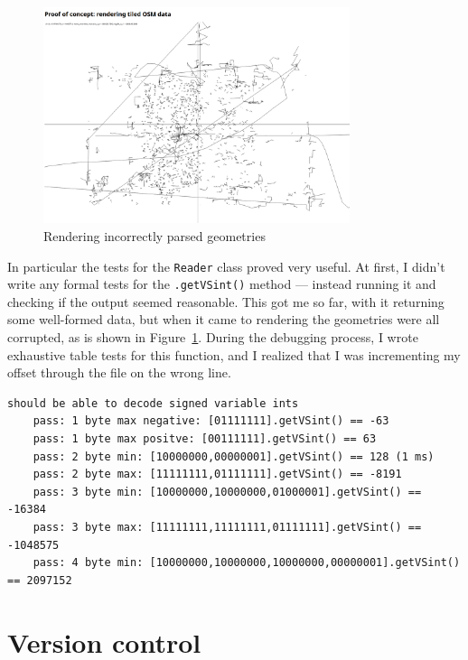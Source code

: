 \documentclass{final_report}
\begin{document}
\begin{figure}[ht]
    \centering
    \includegraphics[width=0.8\textwidth]{../proof-of-concepts/4-rendering-osm-data/screenshots/artifacts.png}
    \caption{Rendering incorrectly parsed geometries}\label{fig:artifacts}
\end{figure}

In particular the tests for the \texttt{Reader} class proved very useful. At first, I didn't write any formal tests for the \texttt{.getVSint()} method --- instead running it and checking if the output seemed reasonable. This got me so far, with it returning some well-formed data, but when it came to rendering the geometries were all corrupted, as is shown in Figure~\ref{fig:artifacts}. During the debugging process, I wrote exhaustive table tests for this function, and I realized that I was incrementing my offset through the file on the wrong line.

\begin{lstlisting}[caption=Output from the \texttt{.getVSint()} test suite, numbers=none]
should be able to decode signed variable ints
    pass: 1 byte max negative: [01111111].getVSint() == -63
    pass: 1 byte max positve: [00111111].getVSint() == 63
    pass: 2 byte min: [10000000,00000001].getVSint() == 128 (1 ms)
    pass: 2 byte max: [11111111,01111111].getVSint() == -8191
    pass: 3 byte min: [10000000,10000000,01000001].getVSint() == -16384
    pass: 3 byte max: [11111111,11111111,01111111].getVSint() == -1048575
    pass: 4 byte min: [10000000,10000000,10000000,00000001].getVSint() == 2097152
\end{lstlisting}

\section{Version control}
\end{document}
